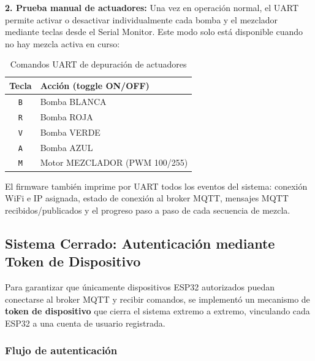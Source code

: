 \documentclass[conference]{IEEEtran}
\begin{document}
\textbf{2. Prueba manual de actuadores:} Una vez en operaci\'on normal, el UART permite activar o desactivar individualmente cada bomba y el mezclador mediante teclas desde el Serial Monitor. Este modo solo est\'a disponible cuando no hay mezcla activa en curso:

\begin{table}[H]
\centering
\caption{Comandos UART de depuraci\'on de actuadores}
\renewcommand{\arraystretch}{1.3}
\begin{tabular}{|c|l|}
\hline
\textbf{Tecla} & \textbf{Acci\'on (toggle ON/OFF)} \\
\hline
\texttt{B} & Bomba BLANCA \\
\hline
\texttt{R} & Bomba ROJA \\
\hline
\texttt{V} & Bomba VERDE \\
\hline
\texttt{A} & Bomba AZUL \\
\hline
\texttt{M} & Motor MEZCLADOR (PWM 100/255) \\
\hline
\end{tabular}
\end{table}

El firmware tambi\'en imprime por UART todos los eventos del sistema: conexi\'on WiFi e IP asignada, estado de conexi\'on al broker MQTT, mensajes MQTT recibidos/publicados y el progreso paso a paso de cada secuencia de mezcla.

\subsection{Sistema Cerrado: Autenticaci\'on mediante Token de Dispositivo}

Para garantizar que \'unicamente dispositivos ESP32 autorizados puedan conectarse al broker MQTT y recibir comandos, se implement\'o un mecanismo de \textbf{token de dispositivo} que cierra el sistema extremo a extremo, vinculando cada ESP32 a una cuenta de usuario registrada.

\subsubsection{Flujo de autenticaci\'on}
\end{document}
